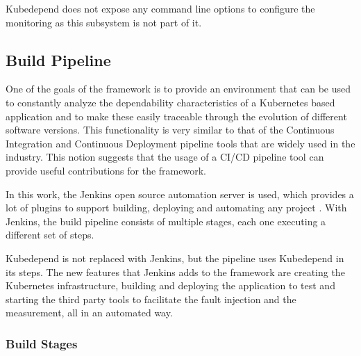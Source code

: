 Kubedepend does not expose any command line options to configure the monitoring as this subsystem is not part of it.

\subsection{Build Pipeline} \label{cicd}


One of the goals of the framework is to provide an environment that can be used to constantly analyze the dependability characteristics of a Kubernetes based application and to make these easily traceable through the evolution of different software versions. This functionality is very similar to that of the Continuous Integration and Continuous Deployment pipeline tools that are widely used in the industry. This notion suggests that the usage of a CI/CD pipeline tool can provide useful contributions for the framework.

In this work, the Jenkins open source automation server is used, which provides a lot of plugins to support building, deploying and automating any project \cite{Jenkins}. With Jenkins, the build pipeline consists of multiple stages, each one executing a different set of steps.
 
Kubedepend is not replaced with Jenkins, but the pipeline uses Kubedepend in its steps. The new features that Jenkins adds to the framework are creating the Kubernetes infrastructure, building and deploying the application to test and starting the third party tools to facilitate the fault injection and the measurement, all in an automated way.

\subsubsection{Build Stages}

